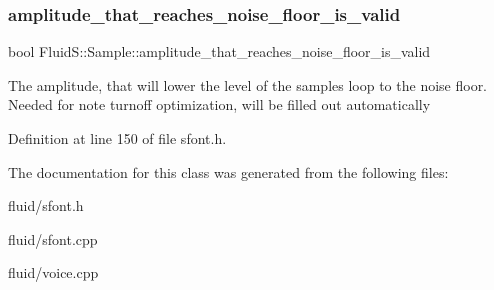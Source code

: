 \subsubsection{\texorpdfstring{amplitude\+\_\+that\+\_\+reaches\+\_\+noise\+\_\+floor\+\_\+is\+\_\+valid}{amplitude\_that\_reaches\_noise\_floor\_is\_valid}}
{\footnotesize\ttfamily bool Fluid\+S\+::\+Sample\+::amplitude\+\_\+that\+\_\+reaches\+\_\+noise\+\_\+floor\+\_\+is\+\_\+valid}

The amplitude, that will lower the level of the sample\textquotesingle{}s loop to the noise floor. Needed for note turnoff optimization, will be filled out automatically 

Definition at line 150 of file sfont.\+h.



The documentation for this class was generated from the following files\+:\begin{DoxyCompactItemize}
\item 
fluid/sfont.\+h\item 
fluid/sfont.\+cpp\item 
fluid/voice.\+cpp\end{DoxyCompactItemize}
